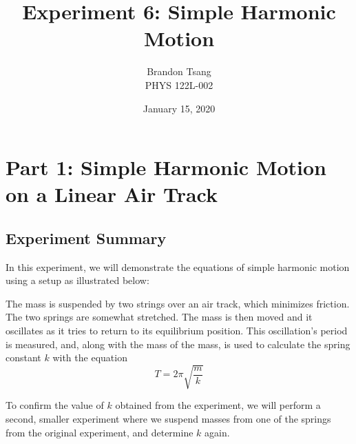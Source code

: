 \documentclass[11pt]{article}
\title{Experiment 6: Simple Harmonic Motion}
\author{
    Brandon Tsang \\
    PHYS 122L-002
}
\date{January 15, 2020}
\begin{document}
\maketitle
\section*{Part 1: Simple Harmonic Motion on a Linear Air Track}
    \subsection*{Experiment Summary}
        In this experiment, we will demonstrate the equations of simple harmonic motion using a setup as illustrated below:
        \vspace{\abovedisplayskip}
        \begin{center}
        \end{center}
        \vspace{\belowdisplayskip}
        The mass is suspended by two strings over an air track, which minimizes friction. The two springs are somewhat stretched. The mass is then moved and it oscillates as it tries to return to its equilibrium position. This oscillation's period is measured, and, along with the mass of the mass, is used to calculate the spring constant $k$ with the equation
        \begin{equation}
            \label{eqn:spring}
            T=2\pi\sqrt{\frac{m}{k}}
        \end{equation}
        \par
        To confirm the value of $k$ obtained from the experiment, we will perform a second, smaller experiment where we suspend masses from one of the springs from the original experiment, and determine $k$ again.
\end{document}
